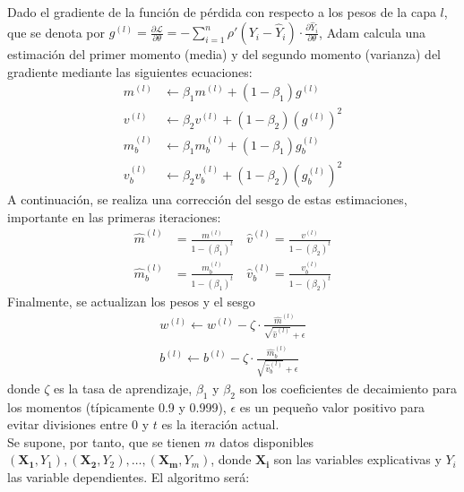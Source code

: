 \documentclass[11pt]{book}
\theoremstyle{plain} %
\theoremstyle{definition} %
\begin{document}
Dado el gradiente de la función de pérdida con respecto a los pesos de la capa $l$, que se denota 
por $g^{(l)} = \frac{\partial \mathcal{L}}{\partial \theta}= -\sum_{i=1}^n \rho'\left(Y_i - \hat{Y}_i\right) \cdot \frac{\partial \hat{Y}_i}{\partial \theta}$, 
Adam calcula una estimación del primer momento (media) y  del segundo momento  (varianza) del 
gradiente mediante las siguientes ecuaciones:
\begin{align*}
   m^{(l)} &\gets \beta_1 m^{(l)} + (1 - \beta_1) g^{(l)} \\
   v^{(l)} &\gets \beta_2 v^{(l)} + (1 - \beta_2) (g^{(l)})^2\\
   m_b^{(l)} &\gets \beta_1 m_b^{(l)} + (1 - \beta_1) g_b^{(l)} \\
v_b^{(l)} &\gets \beta_2 v_b^{(l)} + (1 - \beta_2) (g_b^{(l)})^2 
\end{align*}
A continuación, se realiza una corrección del sesgo de estas estimaciones, importante en las 
primeras iteraciones:
\begin{align*}
   \hat{m}^{(l)} &= \frac{m^{(l)}}{1 - (\beta_1)^t} \quad \hat{v}^{(l)} = \frac{v^{(l)}}{1 - (\beta_2)^t}\\
   \hat{m}_b^{(l)} &= \frac{m_b^{(l)}}{1 - (\beta_1)^t} \quad \hat{v}_b^{(l)} = \frac{v_b^{(l)}}{1 - (\beta_2)^t}
\end{align*}
Finalmente, se actualizan los pesos y el sesgo
\begin{align*}
   w^{(l)} \gets w^{(l)} - \zeta \cdot \frac{\hat{m}^{(l)}}{\sqrt{\hat{v}^{(l)}} + \epsilon}\\
   b^{(l)} \gets b^{(l)} - \zeta \cdot \frac{\hat{m}_b^{(l)}}{\sqrt{\hat{v}_b^{(l)}} + \epsilon}
\end{align*}
donde $\zeta$ es la tasa de aprendizaje, $\beta_1$ y $\beta_2$ son los coeficientes de
decaimiento para los momentos (típicamente 0.9 y 0.999), $\epsilon$ es un pequeño valor positivo
para evitar divisiones entre 0 y $t$ es la iteración actual.\\

Se supone, por tanto, que se tienen $m$ datos disponibles 
$(\mathbf{X_1}, Y_1), (\mathbf{X_2}, Y_2), \dots, (\mathbf{X_m}, Y_m)$, donde $\mathbf{X_i}$ 
son las variables explicativas y $Y_i$ las variable dependientes. El algoritmo será:\\
\end{document}
